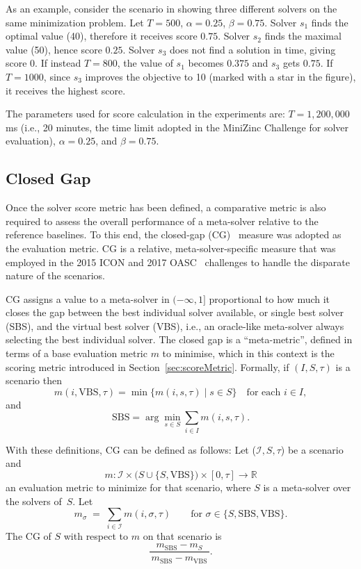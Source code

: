 \documentclass[../../main]{subfiles}
\begin{document}
\medskip

As an example, consider the scenario in  showing three different solvers
on the same minimization problem. Let $T=500$, $\alpha=0.25$, $\beta=0.75$.
Solver $s_1$ finds the optimal value (40), therefore it receives score $0.75$.
Solver $s_2$ finds the maximal value (50), hence score $0.25$. Solver $s_3$
does not find a solution in time, giving score $0$. If instead $T=800$,
the value of $s_1$ becomes $0.375$ and $s_3$ gets $0.75$. If $T=1000$,
since $s_3$ improves the objective to 10 (marked with a star in the figure),
it receives the highest score.

The parameters used for score calculation in the experiments are: $T=1{,}200{,}000$\,ms (i.e., 20 minutes, the time limit adopted in the MiniZinc Challenge for solver evaluation), $\alpha=0.25$, and $\beta=0.75$.

\subsection{Closed Gap}
\label{sec:closedGap}
Once the solver score metric has been defined, a comparative metric is also required to assess the overall performance of a meta-solver relative to the reference baselines.
To this end, the closed-gap (CG)~\cite{evaluationMetaSolvers} measure was adopted as the evaluation metric.
CG is a relative, meta-solver-specific measure that was employed in the 2015 ICON and 2017 OASC~\cite{lindauer2019}
challenges to handle the disparate nature of the scenarios. 

CG assigns a value to a meta-solver in $(-\infty, 1]$ 
proportional to how much it closes the gap between the best individual solver available, 
or single best solver (SBS), and the virtual best solver (VBS), i.e., an 
oracle-like meta-solver always selecting the best individual solver. The closed gap is a ``meta-metric'', defined in terms of a base evaluation metric $m$ to minimise, which in this context is the scoring metric introduced in Section~\ref{sec:scoreMetric}. 
Formally, if $(I, S, \tau)$ is a scenario then 
\[
m(i, \mathrm{VBS}, \tau) = \min \{ m(i, s, \tau) \mid s \in S \}
\quad\text{for each } i \in I,
\]
and 
\[
\mathrm{SBS} = \arg\min_{s \in S} \sum_{i \in I} m(i, s, \tau).
\]

With these definitions, CG can be defined as follows: Let ($\mathcal{I}, S, \tau$) be a scenario and 
\[
m : \mathcal{I} \times \bigl(S \cup \{S, \mathrm{VBS}\}\bigr) \times [0,\tau] \to \mathbb{R}
\]
an evaluation metric to minimize for that scenario, where $S$ is a
meta-solver over the solvers of~$S$.
Let
\[
m_\sigma \;=\; \sum_{i\in\mathcal{I}} m(i,\sigma,\tau)
\qquad\text{for }\sigma\in\{S,\mathrm{SBS},\mathrm{VBS}\}.
\]
The CG of $S$ with respect to $m$ on that scenario is
\[
\frac{m_{\mathrm{SBS}} - m_S}{\,m_{\mathrm{SBS}} - m_{\mathrm{VBS}}\,}.
\]
\end{document}
